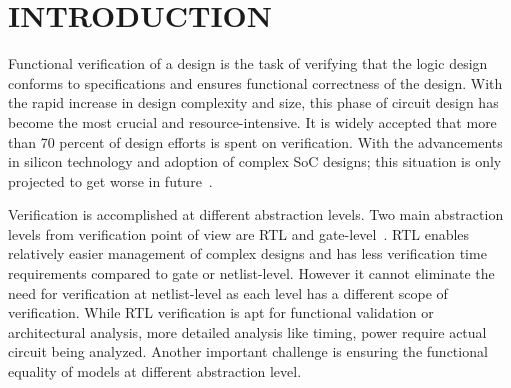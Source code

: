 \chapter{INTRODUCTION}

Functional verification of a design is the task of verifying that the logic design conforms to specifications and ensures functional correctness of the design.  With the rapid increase in design complexity and size, this phase of circuit design has become the most crucial and resource-intensive. It is widely accepted that more than 70 percent of design efforts is spent on verification. With the advancements in silicon technology and adoption of complex SoC designs; this situation is only projected to get worse in future~\citep{phd:zhang}. 

Verification is accomplished at different abstraction levels. Two main abstraction levels from verification point of view are RTL and gate-level~\citep{phd:zhang}. RTL enables relatively easier management of complex designs and has less verification time requirements compared to gate or netlist-level. However it cannot eliminate the need for verification at netlist-level as each level has a different scope of verification. While RTL verification is apt for functional validation or architectural analysis, more detailed analysis like timing, power require actual circuit being analyzed. Another important challenge is ensuring the functional equality of models at different abstraction level.  

